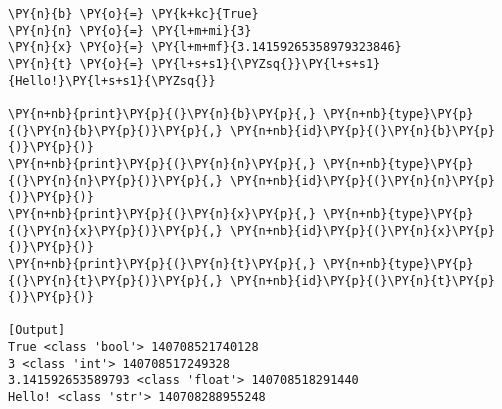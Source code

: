 \begin{Verbatim}[label=\makebox{\href{https://github.com/unipi-physics-labs/statnotes/tree/main/snippy/variables.py}{https://github.com/.../variables.py}},commandchars=\\\{\}]
\PY{n}{b} \PY{o}{=} \PY{k+kc}{True}
\PY{n}{n} \PY{o}{=} \PY{l+m+mi}{3}
\PY{n}{x} \PY{o}{=} \PY{l+m+mf}{3.14159265358979323846}
\PY{n}{t} \PY{o}{=} \PY{l+s+s1}{\PYZsq{}}\PY{l+s+s1}{Hello!}\PY{l+s+s1}{\PYZsq{}}

\PY{n+nb}{print}\PY{p}{(}\PY{n}{b}\PY{p}{,} \PY{n+nb}{type}\PY{p}{(}\PY{n}{b}\PY{p}{)}\PY{p}{,} \PY{n+nb}{id}\PY{p}{(}\PY{n}{b}\PY{p}{)}\PY{p}{)}
\PY{n+nb}{print}\PY{p}{(}\PY{n}{n}\PY{p}{,} \PY{n+nb}{type}\PY{p}{(}\PY{n}{n}\PY{p}{)}\PY{p}{,} \PY{n+nb}{id}\PY{p}{(}\PY{n}{n}\PY{p}{)}\PY{p}{)}
\PY{n+nb}{print}\PY{p}{(}\PY{n}{x}\PY{p}{,} \PY{n+nb}{type}\PY{p}{(}\PY{n}{x}\PY{p}{)}\PY{p}{,} \PY{n+nb}{id}\PY{p}{(}\PY{n}{x}\PY{p}{)}\PY{p}{)}
\PY{n+nb}{print}\PY{p}{(}\PY{n}{t}\PY{p}{,} \PY{n+nb}{type}\PY{p}{(}\PY{n}{t}\PY{p}{)}\PY{p}{,} \PY{n+nb}{id}\PY{p}{(}\PY{n}{t}\PY{p}{)}\PY{p}{)}

[Output]
True <class 'bool'> 140708521740128
3 <class 'int'> 140708517249328
3.141592653589793 <class 'float'> 140708518291440
Hello! <class 'str'> 140708288955248
\end{Verbatim}
